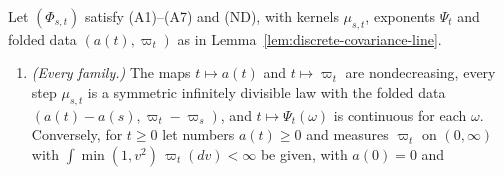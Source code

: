 \begin{theorem}
\label{thm:lattice-line}
\leanok
Let $(\Phi_{s,t})$ satisfy (A1)--(A7) and (ND), with kernels $\mu_{s,t}$, exponents $\Psi_t$ and
folded data $(a(t), \varpi_t)$ as in Lemma~\ref{lem:discrete-covariance-line}.
\begin{enumerate}
\item \emph{(Every family.)} The maps $t \mapsto a(t)$ and $t \mapsto \varpi_t$ are
nondecreasing, every step $\mu_{s,t}$ is a symmetric infinitely divisible law with the folded
data $(a(t) - a(s), \varpi_t - \varpi_s)$, and $t \mapsto \Psi_t(\omega)$ is continuous for each
$\omega$. Conversely, for $t \ge 0$ let numbers $a(t) \ge 0$ and measures $\varpi_t$ on
$(0,\infty)$ with $\int\min(1, v^2)\,\varpi_t(dv) < \infty$ be given, with $a(0) = 0$ and

\end{enumerate}
\end{theorem}
